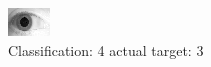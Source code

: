 \begin{figure}[h!]
\begin{center}
\includegraphics[width=0.60\columnwidth]{figures/ID1891_class_4_target_3.png}
\end{center}
\caption{ Classification: 4 actual target: 3}
\label{fig:ID1891_class_4_target_3}
\end{figure}
